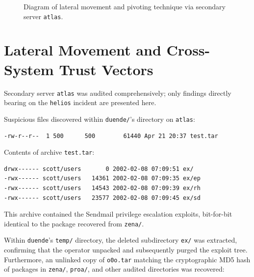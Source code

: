 \begin{figure}[htbp]
\caption{Diagram of lateral movement and pivoting technique via secondary server \texttt{atlas}.}
\label{fig:pivoteo_multisistema}
\end{figure}

\section{Lateral Movement and Cross-System Trust Vectors}

Secondary server \texttt{atlas} was audited comprehensively; only findings directly bearing on the \texttt{helios} incident are presented here.

Suspicious files discovered within \texttt{duende/}'s directory on \texttt{atlas}:

\vspace{1em}

\begin{lstlisting}[style=terminal]
-rw-r--r--  1 500      500        61440 Apr 21 20:37 test.tar
\end{lstlisting}

\vspace{1em}

Contents of archive \texttt{test.tar}:

\vspace{1em}

\begin{lstlisting}[style=terminal] 
drwx------ scott/users       0 2002-02-08 07:09:51 ex/
-rwx------ scott/users   14361 2002-02-08 07:09:35 ex/ep
-rwx------ scott/users   14543 2002-02-08 07:09:39 ex/rh
-rwx------ scott/users   23577 2002-02-08 07:09:45 ex/sd
\end{lstlisting}

\vspace{1em}

This archive contained the Sendmail privilege escalation exploits, bit-for-bit identical to the package recovered from \texttt{zena/}.

Within \texttt{duende}'s \texttt{temp/} directory, the deleted subdirectory \texttt{ex/} was extracted, confirming that the operator unpacked and subsequently purged the exploit tree. Furthermore, an unlinked copy of \texttt{o0o.tar} matching the cryptographic MD5 hash of packages in \texttt{zena/}, \texttt{proa/}, and other audited directories was recovered:

